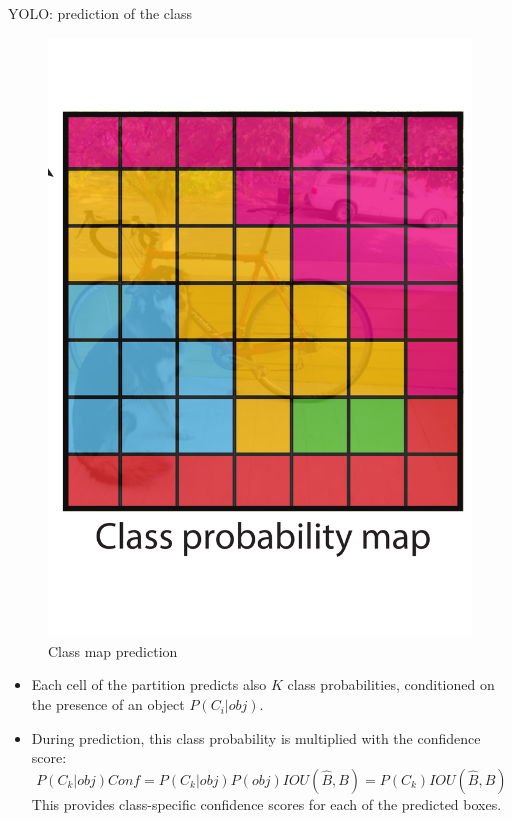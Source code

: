 \documentclass[xcolor=pdftex,dvipsnames,table]{beamer}
\begin{document}
\begin{frame}{YOLO: prediction of the class}
\begin{figure}[htb]
   \centering
   \includegraphics[height=0.4\textheight]{../graphics/YOLO_ClassProbabilityMap.pdf}
   \caption{Class map prediction}
\end{figure}
\begin{itemize}
\item Each cell of the partition predicts also $K$ class probabilities, conditioned on the presence of an object $P(C_i|obj)$. 
\item During prediction, this class probability is multiplied with the confidence score:  
\begin{equation}\nonumber
P(C_k|obj) Conf = P(C_k | obj) P(obj) IOU(\hat{B}, B) = P(C_k) IOU(\hat{B}, B)
\end{equation}
This provides class-specific confidence scores for each of the predicted boxes. 
\end{itemize}
\end{frame}
\end{document}
